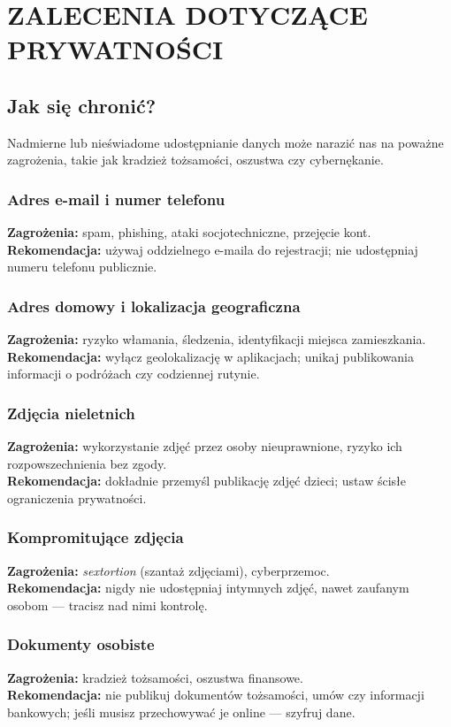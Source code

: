 \chapter{ZALECENIA DOTYCZĄCE PRYWATNOŚCI}
\section{Jak się chronić? \cite{czegoNieUdostepniac}}
Nadmierne lub nieświadome udostępnianie danych może narazić nas na poważne zagrożenia, takie jak kradzież tożsamości, oszustwa czy cybernękanie.

\subsection{Adres e-mail i numer telefonu}
\textbf{Zagrożenia:} spam, phishing, ataki socjotechniczne, przejęcie kont.\\
\textbf{Rekomendacja:} używaj oddzielnego e-maila do rejestracji; nie udostępniaj numeru telefonu publicznie.

\subsection{Adres domowy i lokalizacja geograficzna}
\textbf{Zagrożenia:} ryzyko włamania, śledzenia, identyfikacji miejsca zamieszkania.\\
\textbf{Rekomendacja:} wyłącz geolokalizację w aplikacjach; unikaj publikowania informacji o podróżach czy codziennej rutynie.

\subsection{Zdjęcia nieletnich}
\textbf{Zagrożenia:} wykorzystanie zdjęć przez osoby nieuprawnione, ryzyko ich rozpowszechnienia bez zgody.\\
\textbf{Rekomendacja:} dokładnie przemyśl publikację zdjęć dzieci; ustaw ścisłe ograniczenia prywatności.

\subsection{Kompromitujące zdjęcia}
\textbf{Zagrożenia:} \textit{sextortion} (szantaż zdjęciami), cyberprzemoc.\\
\textbf{Rekomendacja:} nigdy nie udostępniaj intymnych zdjęć, nawet zaufanym osobom — tracisz nad nimi kontrolę.

\subsection{Dokumenty osobiste}
\textbf{Zagrożenia:} kradzież tożsamości, oszustwa finansowe.\\
\textbf{Rekomendacja:} nie publikuj dokumentów tożsamości, umów czy informacji bankowych; jeśli musisz przechowywać je online — szyfruj dane.

